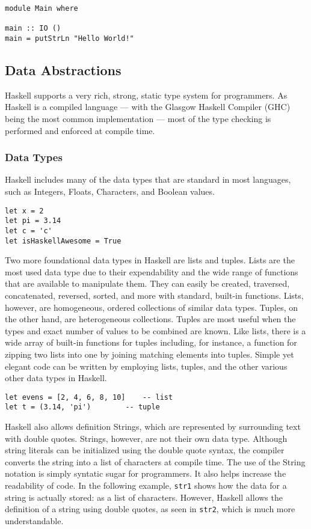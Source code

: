 \documentclass[titlepage,12pt]{article}
\begin{document}
\begin{verbatim}
module Main where

main :: IO ()
main = putStrLn "Hello World!"
\end{verbatim}

\subsection{Data Abstractions}
Haskell supports a very rich, strong, static type system for programmers.  As Haskell is
a compiled language --- with the Glasgow Haskell Compiler (GHC) being the most common implementation ---
most of the type checking is performed and enforced at compile time.

\subsubsection{Data Types}

Haskell includes many of the data types that are standard in most languages, such as Integers, Floats, Characters, and Boolean values. 

\begin{verbatim}
let x = 2
let pi = 3.14
let c = 'c'
let isHaskellAwesome = True
\end{verbatim}

Two more foundational data types in Haskell are lists and tuples. Lists are the most used data type due to their expendability 
and the wide range of functions that are available to manipulate them. They can easily be created, traversed, concatenated, 
reversed, sorted, and more with standard, built-in functions. Lists, however, are homogeneous, ordered collections of
similar data types. Tuples, on the other hand, are heterogeneous collections. Tuples are most useful when the types and exact number of 
values to be combined are known. Like lists, there is a wide array of built-in functions for tuples including, for instance,
a function for zipping two lists into one by joining matching elements into tuples. Simple yet elegant code can be written by
employing lists, tuples, and the other various other data types in Haskell.

\begin{verbatim}
let evens = [2, 4, 6, 8, 10]	-- list
let t = (3.14, 'pi')		-- tuple
\end{verbatim}

Haskell also allows definition Strings, which are represented by surrounding text with double quotes. Strings, however, 
are not their own data type. Although string literals can be initialized using the double quote syntax, the compiler converts the 
string into a list of characters at compile time. The use of the String notation is simply syntatic sugar for programmers. 
It also helps increase the readability of code. In the following example, \texttt{str1} shows how the data for a string is actually stored: as a list of characters. However, Haskell allows the definition of a string using double quotes, as seen in \texttt{str2}, 
which is much more understandable.
\end{document}
